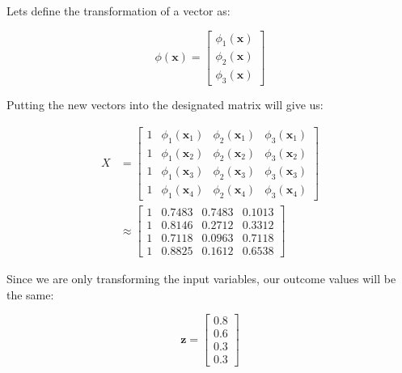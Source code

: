 \documentclass[12pt]{article}
\begin{document}
\begin{enumerate}[leftmargin=\labelsep]
\begin{enumerate}
        Lets define the transformation of a vector as:

        \begin{equation}
            \phi(\mathbf{x}) = \begin{bmatrix}
                \phi_1(\mathbf{x}) \\
                \phi_2(\mathbf{x}) \\
                \phi_3(\mathbf{x})
            \end{bmatrix}
        \end{equation}

        Putting the new vectors into the designated matrix will give us:

        \begin{equation}
        \begin{split}
            X &= \begin{bmatrix}
                1 & \phi_1(\mathbf{x}_1) & \phi_2(\mathbf{x}_1) & \phi_3(\mathbf{x}_1) \\
                1 & \phi_1(\mathbf{x}_2) & \phi_2(\mathbf{x}_2) & \phi_3(\mathbf{x}_2) \\
                1 & \phi_1(\mathbf{x}_3) & \phi_2(\mathbf{x}_3) & \phi_3(\mathbf{x}_3) \\
                1 & \phi_1(\mathbf{x}_4) & \phi_2(\mathbf{x}_4) & \phi_3(\mathbf{x}_4)
            \end{bmatrix} \\
            &\approx \begin{bmatrix}
                1 & 0.7483 & 0.7483 & 0.1013 \\
                1 & 0.8146 & 0.2712 & 0.3312 \\
                1 & 0.7118 & 0.0963 & 0.7118 \\
                1 & 0.8825 & 0.1612 & 0.6538
            \end{bmatrix}
        \end{split}
        \end{equation}

        Since we are only transforming the input variables, our outcome values will be the same:

        \begin{equation}
            \mathbf{z} = \begin{bmatrix}
                0.8 \\
                0.6 \\
                0.3 \\
                0.3
            \end{bmatrix}
        \end{equation}


\end{enumerate}
\end{enumerate}
\end{document}
